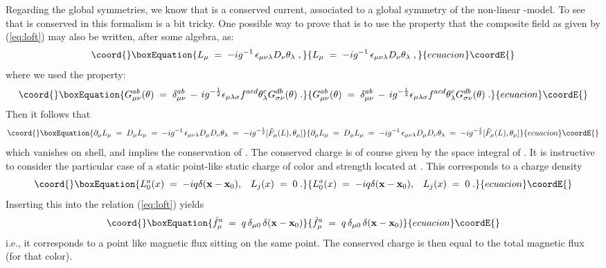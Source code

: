 \documentclass[a4paper,12pt]{article}
\begin{document}
Regarding the global symmetries, we know that \coordHE{} is a conserved current, 
associated to a global symmetry of the non-linear \myHighlight{$\sigma$}\coordHE{}-model. To see that 
\coordHE{} is conserved in this formalism is a bit tricky. One possible way to
prove that is to use the property that the composite field \coordHE{} as given 
by (\ref{eq:loft}) may also be written, after some algebra, as:
\begin{equation}\coord{}\boxEquation{\label{eq:eqlt}
L_\mu \;=\; -i g^{-1} \, \epsilon_{\mu\nu\lambda} D_\nu \theta_\lambda \;,
}{L_\mu \;=\; -i g^{-1} \, \epsilon_{\mu\nu\lambda} D_\nu \theta_\lambda \;,
}{ecuacion}\coordE{}\end{equation}
where we used the property:
\begin{equation}\coord{}\boxEquation{
G_{\mu\nu}^{ab} (\theta) \;=\; \delta_{\mu\nu}^{ab} \,-\, i g^{-\frac{1}{2}}
\epsilon_{\mu\lambda\sigma} f^{acd} \theta_\lambda^c G_{\sigma\nu}^{db}(\theta)
\;. 
}{
G_{\mu\nu}^{ab} (\theta) \;=\; \delta_{\mu\nu}^{ab} \,-\, i g^{-\frac{1}{2}}
\epsilon_{\mu\lambda\sigma} f^{acd} \theta_\lambda^c G_{\sigma\nu}^{db}(\theta)
\;. 
}{ecuacion}\coordE{}\end{equation}
Then it follows that
\begin{equation}\coord{}\boxEquation{\label{eq:global}
\partial_\mu L_\mu \;=\; D_\mu L_\mu \;=\; -i g^{-1} \, \epsilon_{\mu\nu\lambda} 
D_\mu D_\nu \theta_\lambda \;=\;  -i g^{-\frac{1}{2}} [ {\tilde F}_\mu (L),
\theta_\mu ]  
}{\partial_\mu L_\mu \;=\; D_\mu L_\mu \;=\; -i g^{-1} \, \epsilon_{\mu\nu\lambda} 
D_\mu D_\nu \theta_\lambda \;=\;  -i g^{-\frac{1}{2}} [ {\tilde F}_\mu (L),
\theta_\mu ]  
}{ecuacion}\coordE{}\end{equation}
which vanishes on shell, and implies the conservation of \coordHE{}.
The conserved charge is of course given by the space integral of \coordHE{}. It is 
instructive to consider the particular case of a static point-like static charge
of color \coordHE{} and strength \coordHE{} located at \coordHE{}. 
This corresponds to a charge density
\begin{equation}\coord{}\boxEquation{
L^a_0 (x) \;=\; - i q \delta ({\mathbf x} - {\mathbf x}_0) ,\;\;\;
L_j (x) \;=\; 0\;.
}{
L^a_0 (x) \;=\; - i q \delta ({\mathbf x} - {\mathbf x}_0) ,\;\;\;
L_j (x) \;=\; 0\;.
}{ecuacion}\coordE{}\end{equation}
Inserting this into the relation (\ref{eq:loft}) yields
\begin{equation}\coord{}\boxEquation{
{\tilde f}_\mu^a \;=\; q \, \delta_{\mu 0} \, 
\delta({\mathbf x} - {\mathbf x}_0)
}{
{\tilde f}_\mu^a \;=\; q \, \delta_{\mu 0} \, 
\delta({\mathbf x} - {\mathbf x}_0)
}{ecuacion}\coordE{}\end{equation}
i.e., it corresponds to a point like magnetic flux sitting on the same point.
The conserved charge is then equal to the total magnetic flux (for that color).
\end{document}
